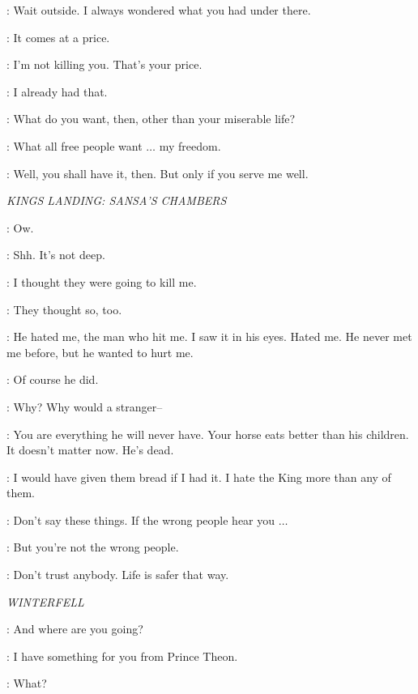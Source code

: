 \THEON:  Wait outside.  I always wondered what you had under there. 

\OSHA: It comes at a price. 

\THEON: I'm not killing you. That's your price. 

\OSHA: I already had that. 

\THEON: What do you want, then, other than your miserable life? 

\OSHA: What all free people want $\ldots$ my freedom. 

\THEON: Well, you shall have it, then. But only if you serve me well. 


\scene

\textit{KINGS LANDING: SANSA'S CHAMBERS}


\SANSA: Ow. 

\SHAE: Shh. It's not deep. 

\SANSA: I thought they were going to kill me. 

\SHAE: They thought so, too. 

\SANSA: He hated me, the man who hit me. I saw it in his eyes. Hated me. He never met me before, but he wanted to hurt me. 

\SHAE: Of course he did. 

\SANSA: Why? Why would a stranger--

\SHAE: You are everything he will never have. Your horse eats better than his children. It doesn't matter now. He's dead. 

\SANSA: I would have given them bread if I had it. I hate the King more than any of them. 

\SHAE: Don't say these things. If the wrong people hear you $\ldots$ 

\SANSA: But you're not the wrong people. 

\SHAE: Don't trust anybody. Life is safer that way. 


\scene

\textit{WINTERFELL} 


\DRENNAN: And where are you going? 

\OSHA: I have something for you from Prince Theon. 

\DRENNAN: What? 


